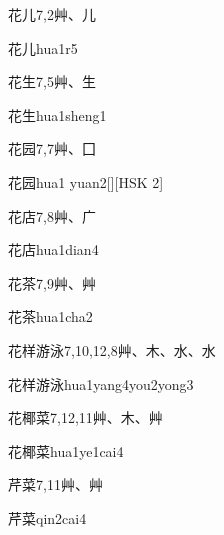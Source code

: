 \begin{entry}{花儿}{7,2}{⾋、⼉}
  \begin{phonetics}{花儿}{hua1r5}
  \end{phonetics}
\end{entry}

\begin{entry}{花生}{7,5}{⾋、⽣}
  \begin{phonetics}{花生}{hua1sheng1}
  \end{phonetics}
\end{entry}

\begin{entry}{花园}{7,7}{⾋、⼞}
  \begin{phonetics}{花园}{hua1 yuan2}[][HSK 2]
  \end{phonetics}
\end{entry}

\begin{entry}{花店}{7,8}{⾋、⼴}
  \begin{phonetics}{花店}{hua1dian4}
  \end{phonetics}
\end{entry}

\begin{entry}{花茶}{7,9}{⾋、⾋}
  \begin{phonetics}{花茶}{hua1cha2}
  \end{phonetics}
\end{entry}

\begin{entry}{花样游泳}{7,10,12,8}{⾋、⽊、⽔、⽔}
  \begin{phonetics}{花样游泳}{hua1yang4you2yong3}
  \end{phonetics}
\end{entry}

\begin{entry}{花椰菜}{7,12,11}{⾋、⽊、⾋}
  \begin{phonetics}{花椰菜}{hua1ye1cai4}
  \end{phonetics}
\end{entry}

\begin{entry}{芹菜}{7,11}{⾋、⾋}
  \begin{phonetics}{芹菜}{qin2cai4}
  \end{phonetics}
\end{entry}


